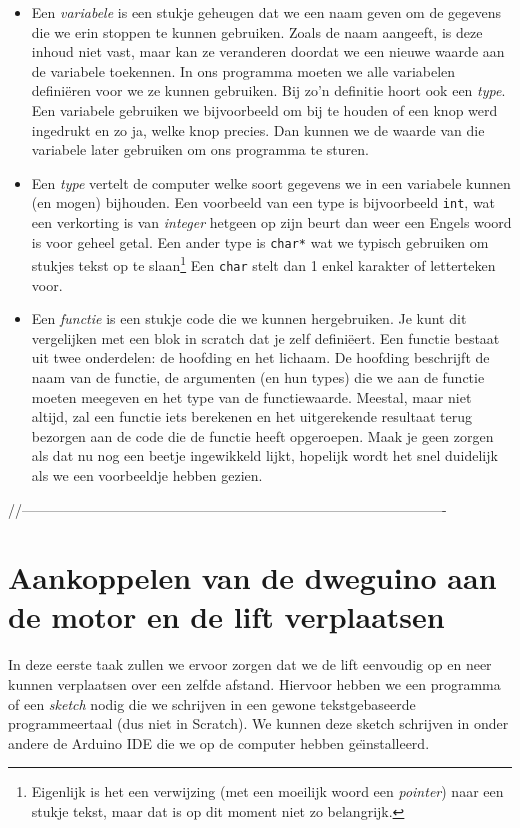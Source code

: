 \documentclass[a4paper, 10pt]{article}
\begin{document}
\begin{itemize}
\item
    Een {\em variabele} is een stukje geheugen dat we een naam geven om de gegevens die we erin stoppen te kunnen gebruiken.
    Zoals de naam aangeeft, is deze inhoud niet vast, maar kan ze veranderen doordat we een nieuwe waarde aan de variabele toekennen.
    In ons programma moeten we alle variabelen defini\"eren voor we ze kunnen gebruiken. Bij zo'n definitie hoort ook een {\em type}.
    Een variabele gebruiken we bijvoorbeeld om bij te houden of een knop werd ingedrukt en zo ja, welke knop precies. Dan kunnen
    we de waarde van die variabele later gebruiken om ons programma te sturen.
\item
    Een {\em type} vertelt de computer welke soort gegevens we in een variabele kunnen (en mogen) bijhouden. Een voorbeeld
    van een type is bijvoorbeeld \texttt{int}, wat een verkorting is van {\em integer} hetgeen op zijn beurt dan weer
    een Engels woord is voor geheel getal. Een ander type is \texttt{char*} wat we typisch gebruiken om stukjes tekst op
    te slaan\footnote{Eigenlijk is het een verwijzing (met een moeilijk woord een {\em pointer}) naar een stukje tekst, maar dat is
    op dit moment niet zo belangrijk.} Een \texttt{char} stelt dan 1 enkel karakter of letterteken voor.
\item
    Een {\em functie} is een stukje code die we kunnen hergebruiken. Je kunt dit vergelijken met een blok in scratch dat je zelf
    defini\"eert. Een functie bestaat uit twee onderdelen: de hoofding en het lichaam. De hoofding beschrijft de naam van
    de functie, de argumenten (en hun types) die we aan de functie moeten meegeven en het type van de functiewaarde. Meestal,
    maar niet altijd, zal een functie iets berekenen en het uitgerekende resultaat terug bezorgen aan de code die de functie
    heeft opgeroepen. Maak je geen zorgen als dat nu nog een beetje ingewikkeld lijkt, hopelijk wordt het snel duidelijk
    als we een voorbeeldje hebben gezien.
\end{itemize}


//-------------------------------------------------------------------------------------------
\section{Aankoppelen van de dweguino aan de motor en de lift verplaatsen}

In deze eerste taak zullen we ervoor zorgen dat we de lift eenvoudig op en neer kunnen verplaatsen over een zelfde
afstand. Hiervoor hebben we een programma of een {\em sketch} nodig die we schrijven in een gewone tekstgebaseerde
programmeertaal (dus niet in Scratch). We kunnen deze sketch schrijven in onder andere de Arduino IDE die we op de
computer hebben ge\"\i nstalleerd.
\end{document}

